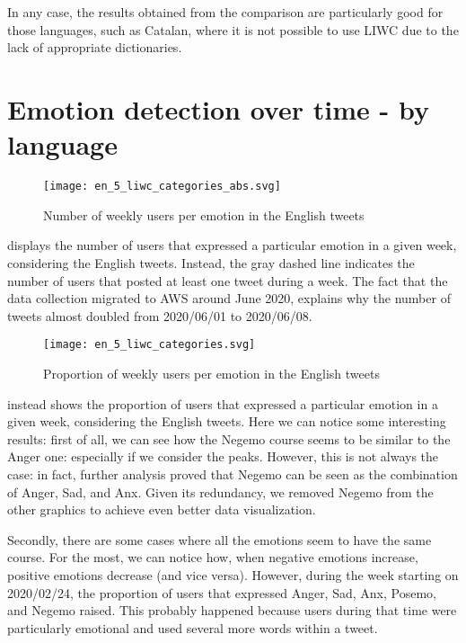 In any case, the results obtained from the comparison are particularly good for those languages, such as Catalan, where it is not possible to use LIWC due to the lack of appropriate dictionaries.

\section{Emotion detection over time - by language}
\label{sec:emotion-by-language-results}

\begin{figure}[H]
	\centering
    	\texttt{[image: en\_5\_liwc\_categories\_abs.svg]}
    	\caption{Number of weekly users per emotion in the English tweets}
    	\label{fig:en-5-liwc-categories-abs}
\end{figure}

 displays the number of users that expressed a particular emotion in a given week, considering the English tweets. Instead, the gray dashed line indicates the number of users that posted at least one tweet during a week. The fact that the data collection migrated to AWS around June 2020, explains why the number of tweets almost doubled from 2020/06/01 to 2020/06/08.

\begin{figure}[H]
	\centering
    	\texttt{[image: en\_5\_liwc\_categories.svg]}
    	\caption{Proportion of weekly users per emotion in the English tweets}
    	\label{fig:en-5-liwc-categories}
\end{figure}

 instead shows the proportion of users that expressed a particular emotion in a given week, considering the English tweets. Here we can notice some interesting results: first of all, we can see how the Negemo course seems to be similar to the  Anger one: especially if we consider the peaks. However, this is not always the case: in fact, further analysis proved that Negemo can be seen as the combination of Anger, Sad, and Anx. Given its redundancy, we removed Negemo from the other graphics to achieve even better data visualization.

Secondly, there are some cases where all the emotions seem to have the same course. For the most, we can notice how, when negative emotions increase, positive emotions decrease (and vice versa). However, during the week starting on 2020/02/24, the proportion of users that expressed Anger, Sad, Anx, Posemo, and Negemo raised. This probably happened because users during that time were particularly emotional and used several more words within a tweet.

